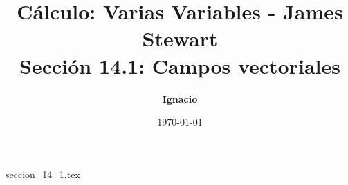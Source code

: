 \documentclass[11pt,spanish,oneside]{report}
\title{\textbf{Cálculo: Varias Variables - James Stewart} \\ \Large Sección 14.1: Campos vectoriales}
\author{\textbf{Ignacio}}
\date{\today}
\begin{document}
\maketitle

{seccion_14_1.tex}
\end{document}
